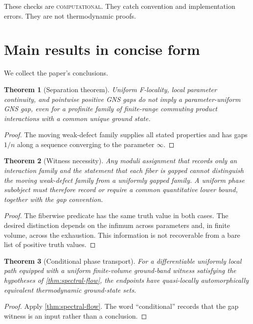 \documentclass[12pt]{article}
\newtheorem{theorem}{Theorem}[section]
\theoremstyle{definition}
\theoremstyle{remark}
\newcommand{\status}[1]{\textsc{#1}}
\begin{document}
These checks are \status{computational}. They catch convention and
implementation errors. They are not thermodynamic proofs.

\section{Main results in concise form}

We collect the paper's conclusions.

\begin{theorem}[Separation theorem]
Uniform F-locality, local parameter continuity, and pointwise positive GNS
gaps do not imply a parameter-uniform GNS gap, even for a profinite family of
finite-range commuting product interactions with a common unique ground
state.
\end{theorem}

\begin{proof}
The moving weak-defect family supplies all stated properties and has gaps
$1/n$ along a sequence converging to the parameter $\infty$.
\end{proof}

\begin{theorem}[Witness necessity]
Any moduli assignment that records only an interaction family and the statement
that each fiber is gapped cannot distinguish the moving weak-defect family from
a uniformly gapped family. A uniform phase subobject must therefore record or
require a common quantitative lower bound, together with the gap convention.
\end{theorem}

\begin{proof}
The fiberwise predicate has the same truth value in both cases. The desired
distinction depends on the infimum across parameters and, in finite volume,
across the exhaustion. This information is not recoverable from a bare list of
positive truth values.
\end{proof}

\begin{theorem}[Conditional phase transport]
For a differentiable uniformly local path equipped with a uniform
finite-volume ground-band witness satisfying the hypotheses of
\cref{thm:spectral-flow}, the endpoints have quasi-locally automorphically
equivalent thermodynamic ground-state sets.
\end{theorem}

\begin{proof}
Apply \cref{thm:spectral-flow}. The word ``conditional'' records that the gap
witness is an input rather than a conclusion.
\end{proof}
\end{document}
